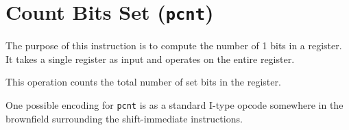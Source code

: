 
\section{Count Bits Set (\texttt{pcnt})}

The purpose of this instruction is to compute the number of 1 bits in a
register. It takes a single register as input and operates on the entire
register.

This operation counts the total number of set bits in the register.





One possible encoding for \texttt{pcnt} is as a standard I-type opcode somewhere
in the brownfield surrounding the shift-immediate instructions.

%
%
%
%
%
%
%
%
%
%

